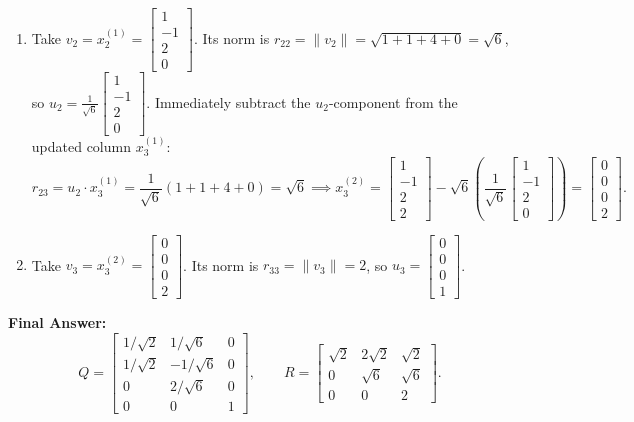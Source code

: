 \documentclass[11pt, letterpaper]{article}
\theoremstyle{definition}
\theoremstyle{remark}
\begin{document}
\begin{enumerate}[label=\textbf{Stage \arabic*:}]
\begin{align*}
    \end{align*}
    \item Take $v_2 = x_2^{(1)} = \begin{bmatrix} 1 \\ -1 \\ 2 \\ 0 \end{bmatrix}$. Its norm is $r_{22} = \|v_2\| = \sqrt{1 + 1 + 4 + 0} = \sqrt{6}$, so $u_2 = \frac{1}{\sqrt{6}}\begin{bmatrix} 1 \\ -1 \\ 2 \\ 0 \end{bmatrix}$. Immediately subtract the $u_2$-component from the updated column $x_3^{(1)}$:
    \[
        r_{23} = u_2 \cdot x_3^{(1)} = \frac{1}{\sqrt{6}}(1 + 1 + 4 + 0) = \sqrt{6} \implies x_3^{(2)} = \begin{bmatrix} 1 \\ -1 \\ 2 \\ 2 \end{bmatrix} - \sqrt{6}\left(\frac{1}{\sqrt{6}}\begin{bmatrix} 1 \\ -1 \\ 2 \\ 0 \end{bmatrix}\right) = \begin{bmatrix} 0 \\ 0 \\ 0 \\ 2 \end{bmatrix}.
    \]
    \item Take $v_3 = x_3^{(2)} = \begin{bmatrix} 0 \\ 0 \\ 0 \\ 2 \end{bmatrix}$. Its norm is $r_{33} = \|v_3\| = 2$, so $u_3 = \begin{bmatrix} 0 \\ 0 \\ 0 \\ 1 \end{bmatrix}$.
\end{enumerate}
\textbf{Final Answer:}
\[
    Q = \begin{bmatrix}
        1/\sqrt{2} & 1/\sqrt{6} & 0 \\
        1/\sqrt{2} & -1/\sqrt{6} & 0 \\
        0 & 2/\sqrt{6} & 0 \\
        0 & 0 & 1
    \end{bmatrix}, \qquad
    R = \begin{bmatrix}
        \sqrt{2} & 2\sqrt{2} & \sqrt{2} \\
        0 & \sqrt{6} & \sqrt{6} \\
        0 & 0 & 2
    \end{bmatrix}.
\]
\end{document}
